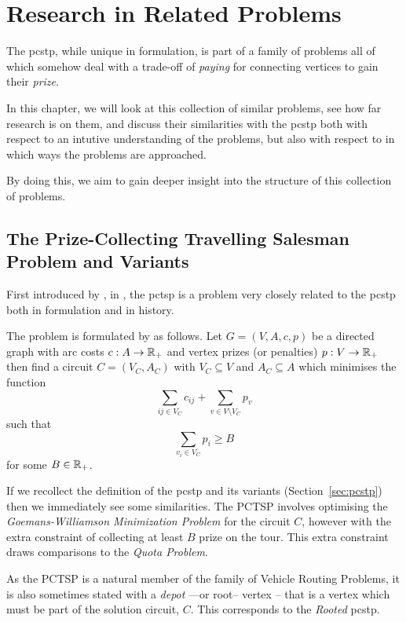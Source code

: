 \chapter{Research in Related Problems}
\label{chap:related}
The \gls{pcstp}, while unique in formulation,
is part of a family of problems all of which somehow deal with a
trade-off of \textit{paying} for connecting vertices to gain their \textit{prize}.

In this chapter, we will look at this collection of similar problems,
see how far research is on them,
and discuss their similarities with the \gls{pcstp}
both with respect to an intutive understanding of the problems,
but also with respect to in which ways the problems are approached.

By doing this, we aim to gain deeper insight into the structure of
this collection of problems.


\section{The Prize-Collecting Travelling Salesman Problem and Variants}\label{sec:rel:tsp}
First introduced by \citet*{balas1989prize}, in \citeyear{balas1989prize},
the \gls{pctsp} is a problem very closely related to the \gls{pcstp} both
in formulation and in history.

The problem is formulated by \citeauthor{balas1989prize} as follows. Let
$G = (V, A, c, p)$ be a directed
graph with arc costs $c: A \to \mathbb{R}_+$ and vertex prizes (or penalties) $p: V \to \mathbb{R}_+$
then find a circuit $C = (V_C, A_C)$ with $V_C \subseteq V$ and $A_C \subseteq A$ which
minimises the function
$$\sum_{ij \in V_C} c_{ij} + \sum_{v \in V \setminus V_C} p_v$$
such that
$$\sum_{v_i \in V_C} p_i \geq B$$
for some $B \in \mathbb{R}_+$.

If we recollect the definition of the \gls{pcstp}
and its variants (Section~\ref{sec:pcstp}) then
we immediately see some similarities. The PCTSP involves optimising the
\textit{Goemans-Williamson Minimization Problem} for the circuit $C$,
however with the extra
constraint of collecting at least $B$ prize on the tour.
This extra constraint draws comparisons
to the \textit{Quota Problem}.

As the PCTSP is a natural member of the family of Vehicle Routing Problems, it is also sometimes
stated with a \textit{depot} ---or root--
vertex \citep{feillet2005traveling} -- that is a vertex which
must be part of the solution circuit, $C$. This corresponds to the \textit{Rooted}
\gls{pcstp}.

